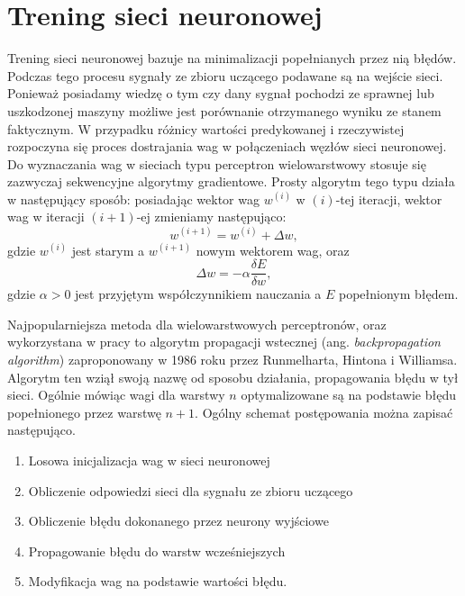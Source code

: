 \documentclass[inzynierska]{pwr_wmat_praca_dyplomowa}
\theoremstyle{plain}
\numberwithin{theorem}{chapter}
\theoremstyle{definition}
\numberwithin{theorem}{chapter}
\begin{document}
\section{Trening sieci neuronowej}

Trening sieci neuronowej bazuje na minimalizacji popełnianych przez nią błędów. Podczas tego procesu sygnały ze zbioru uczącego podawane są na wejście sieci. Ponieważ posiadamy wiedzę o tym czy dany sygnał pochodzi ze sprawnej lub uszkodzonej maszyny możliwe jest porównanie otrzymanego wyniku ze stanem faktycznym. W przypadku różnicy wartości predykowanej i rzeczywistej rozpoczyna się proces dostrajania wag w połączeniach węzłów sieci neuronowej. Do wyznaczania wag w sieciach typu perceptron wielowarstwowy stosuje się zazwyczaj sekwencyjne algorytmy gradientowe. Prosty algorytm tego typu działa w następujący sposób: posiadając wektor wag $w^{(i)}$ w $(i)$-tej iteracji, wektor wag w iteracji $(i+1)$-ej zmieniamy następująco:
\begin{equation}
	w^{(i+1)} = w^{(i)} + \Delta w,
\end{equation}
gdzie $w^{(i)}$ jest starym a $w^{(i+1)}$ nowym wektorem wag, oraz
\begin{equation}
	\Delta w = -\alpha \frac{\delta E}{\delta w},
\end{equation}
gdzie $\alpha > 0$ jest przyjętym współczynnikiem nauczania a $E$ popełnionym błędem.


Najpopularniejsza metoda dla wielowarstwowych perceptronów, oraz wykorzystana w pracy to algorytm propagacji wstecznej (ang. \textit{backpropagation algorithm})\cite{rumelhart1986learning} zaproponowany w 1986 roku przez Runmelharta, Hintona i Williamsa. Algorytm ten wziął swoją nazwę od sposobu działania, propagowania błędu w tył sieci. Ogólnie mówiąc wagi dla warstwy $n$ optymalizowane są na podstawie błędu popełnionego przez warstwę $n+1$. Ogólny schemat postępowania można zapisać następująco. 
\begin{enumerate}
	\item Losowa inicjalizacja wag w sieci neuronowej
	\item Obliczenie odpowiedzi sieci dla sygnału ze zbioru uczącego
	\item Obliczenie błędu dokonanego przez neurony wyjściowe
	\item Propagowanie błędu do warstw wcześniejszych
	\item Modyfikacja wag na podstawie wartości błędu.
\end{enumerate}
\end{document}
